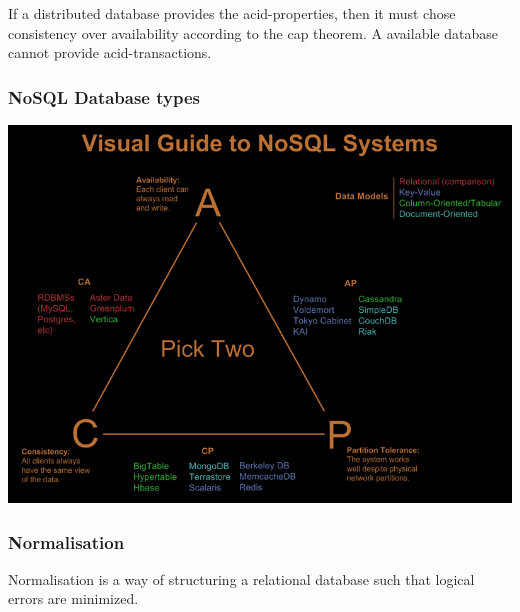 If a distributed database provides the acid-properties, then it must chose consistency over availability according to the cap theorem. A available database cannot provide acid-transactions. 

\subsubsection{NoSQL Database types}
\includegraphics[scale=0.5]{images/cap_choice.png}


\subsubsection{Normalisation}
Normalisation is a way of structuring a relational database such that logical errors are minimized. 


